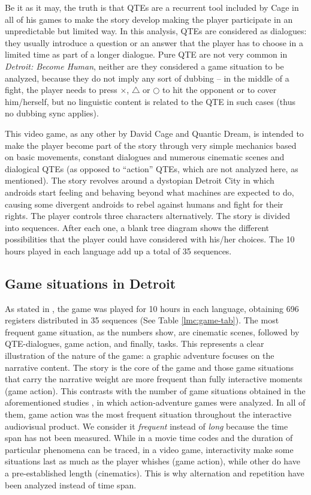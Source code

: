 \documentclass[output=paper]{langsci/langscibook}
\begin{document}
Be it as it may, the truth is that QTEs are a recurrent tool included by Cage in all of his games to make the story develop making the player participate in an unpredictable but limited way. In this analysis, QTEs are considered as dialogues: they usually introduce a question or an answer that the player has to choose in a limited time as part of a longer dialogue. Pure QTE are not very common in \textit{Detroit: Become Human}, neither are they considered a game situation to be analyzed, because they do not imply any sort of dubbing -- in the middle of a fight, the player needs to press ${\times}$, ${\bigtriangleup}$ or ${\bigcirc}$ to hit the opponent or to cover him/herself, but no linguistic content is related to the QTE in such cases (thus no dubbing sync applies).

This video game, as any other by David Cage and Quantic Dream, is intended to make the player become part of the story through very simple mechanics based on basic movements, constant dialogues and numerous cinematic scenes and dialogical QTEs (as opposed to \enquote{action} QTEs, which are not analyzed here, as mentioned). The story revolves around a dystopian Detroit City in which androids start feeling and behaving beyond what machines are expected to do, causing some divergent androids to rebel against humans and fight for their rights. The player controls three characters alternatively. The story is divided into sequences. After each one, a blank tree diagram shows the different possibilities that the player could have considered with his/her choices. The 10 hours played in each language add up a total of 35 sequences.

\subsection{Game situations in Detroit}\label{lmc:gamsit}

As stated in , the game was played for 10 hours in each language, obtaining 696 registers distributed in 35 sequences (See Table \ref{lmc:game-tab}). The most frequent game situation, as the numbers show, are cinematic scenes, followed by QTE-dialogues, game action, and finally, tasks. This represents a clear illustration of the nature of the game: a graphic adventure focuses on the narrative content. The story is the core of the game and those game situations that carry the narrative weight are more frequent than fully interactive moments (game action). This contrasts with the number of game situations obtained in the aforementioned studies \parencites{mejias17}{mejias19}, in which action-adventure games were analyzed. In all of them, game action was the most frequent situation throughout the interactive audiovisual product. We consider it \emph{frequent} instead of \emph{long} because the time span has not been measured. While in a movie time codes and the duration of particular phenomena can be traced, in a video game, interactivity make some situations last as much as the player whishes (game action), while other do have a pre-established length (cinematics). This is why alternation and repetition have been analyzed instead of time span.
\end{document}
